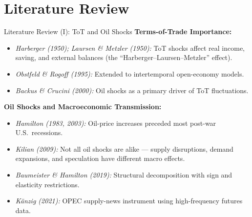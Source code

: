 \documentclass[10pt,aspectratio=169]{beamer}
\begin{document}
\section{Literature Review}

\begin{frame}{Literature Review (I): ToT and Oil Shocks}
  \textbf{Terms-of-Trade Importance:}
  \begin{itemize}
    \item \textit{Harberger (1950); Laursen \& Metzler (1950):} ToT shocks affect real income, saving, and external balances (the ``Harberger--Laursen--Metzler'' effect).
    \item \textit{Obstfeld \& Rogoff (1995):} Extended to intertemporal open-economy models.
    \item \textit{Backus \& Crucini (2000):} Oil shocks as a primary driver of ToT fluctuations.
  \end{itemize}
  \vspace{0.3cm}
  \textbf{Oil Shocks and Macroeconomic Transmission:}
  \begin{itemize}
    \item \textit{Hamilton (1983, 2003):} Oil-price increases preceded most post-war U.S.\ recessions.
    \item \textit{Kilian (2009):} Not all oil shocks are alike --- supply disruptions, demand expansions, and speculation have different macro effects.
    \item \textit{Baumeister \& Hamilton (2019):} Structural decomposition with sign and elasticity restrictions.
    \item \textit{K\"anzig (2021):} OPEC supply-news instrument using high-frequency futures data.
  \end{itemize}
\end{frame}
\end{document}
